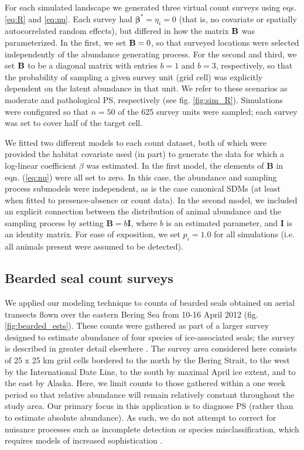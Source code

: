 \documentclass[times,mee,doublespace,]{besauth2}
\begin{document}
For each simulated landscape we generated three virtual count surveys using eqs. \ref{eq:R} and \ref{eq:nu}.  Each survey had $\boldsymbol{\beta}^*=\eta_i=0$ (that is, no covariate or spatially autocorrelated random effects), but differed in how the matrix ${\bf B}$ was parameterized.  In the first, we set ${\bf B}=0$, so that surveyed locations were selected independently of the abundance generating process.  For the second and third, we set ${\bf B}$ to be a diagonal matrix with entries $b=1$ and $b=3$, respectively, so that the probability of sampling a given survey unit (grid cell) was explicitly dependent on the latent abundance in that unit.  We refer to these scenarios as moderate and pathological PS, respectively (see fig. \ref{fig:sim_R}).  Simulations were configured so that $n=50$ of the 625 survey units were sampled; each survey was set to cover half of the target cell.

We fitted two different models to each count dataset, both of which were provided the habitat covariate used (in part) to generate the data for which a log-linear coefficient $\beta$ was estimated.  In the first model, the elements of \textbf{B} in eqn. (\ref{eq:nu}) were all set to zero.  In this case, the abundance and sampling process submodels were independent, as is the case canonical SDMs (at least when fitted to presence-absence or count data).  In the second model, we included an explicit connection between the distribution of animal abundance and the sampling process by setting $\textbf{B}=b\textbf{I}$, where $b$ is an estimated parameter, and \textbf{I} is an identity matrix. For ease of exposition, we set $p_i = 1.0$ for all simulations (i.e. all animals present were assumed to be detected).


\subsection{Bearded seal count surveys}

We applied our modeling technique to counts of bearded seals obtained on aerial transects flown over the eastern Bering Sea from 10-16 April 2012 (fig. \ref{fig:bearded_ests}). These counts were gathered as part of a larger survey designed to estimate abundance of four species of ice-associated seals; the survey is described in greater detail elsewhere \citep{ConnEtAl2014,ConnEtAl2015}. The survey area considered here consists of 25 x 25 km grid cells bordered to the north by the Bering Strait, to the west by the International Date Line, to the south by maximal April ice extent, and to the east by Alaska. Here, we limit counts to those gathered within a one week period so that relative abundance will remain relatively constant throughout the study area.  Our primary focus in this application is to diagnose PS (rather than to estimate absolute abundance).  As such, we do not attempt to correct for nuisance processes such as incomplete detection or species misclassification, which requires models of increased sophistication \citep{ConnEtAl2014}.
\end{document}
